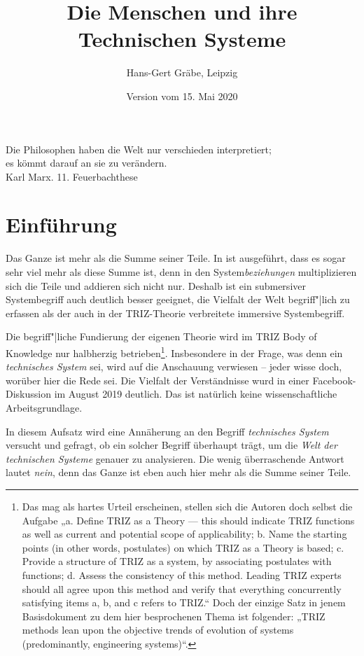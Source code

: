 \documentclass[11pt,a4paper]{article}
\title{Die Menschen und ihre Technischen Systeme}
\author{Hans-Gert Gräbe, Leipzig}
\date{Version vom 15. Mai 2020}
\begin{document}
\maketitle\vfill
\tableofcontents
\pagebreak
\begin{flushright}
  Die Philosophen haben die Welt nur verschieden interpretiert;\\ es kömmt
  darauf an sie zu verändern.\\ Karl Marx. 11. Feuerbachthese
\end{flushright}

\section{Einführung}

Das Ganze ist mehr als die Summe seiner Teile. In \cite{Graebe2020} ist
ausgeführt, dass es sogar sehr viel mehr als diese Summe ist, denn in den
System\emph{beziehungen} multiplizieren sich die Teile und addieren sich nicht
nur.  Deshalb ist ein submersiver Systembegriff auch deutlich besser geeignet,
die Vielfalt der Welt begriff"|lich zu erfassen als der auch in der
TRIZ-Theorie verbreitete immersive Systembegriff.

Die begriff"|liche Fundierung der eigenen Theorie wird im TRIZ Body of
Knowledge \cite{TBK-2007} nur halbherzig betrieben\footnote{Das mag als hartes
  Urteil erscheinen, stellen sich die Autoren doch selbst die Aufgabe „a.
  Define TRIZ as a Theory — this should indicate TRIZ functions as well as
  current and potential scope of applicability; b.  Name the starting points
  (in other words, postulates) on which TRIZ as a Theory is based; c.  Provide
  a structure of TRIZ as a system, by associating postulates with functions;
  d.  Assess the consistency of this method. Leading TRIZ experts should all
  agree upon this method and verify that everything concurrently satisfying
  items a, b, and c refers to TRIZ.“ Doch der einzige Satz in jenem
  Basisdokument zu dem hier besprochenen Thema ist folgender: „TRIZ methods
  lean upon the objective trends of evolution of systems (predominantly,
  engineering systems)“.}. Insbesondere in der Frage, was denn ein
\emph{technisches System} sei, wird auf die Anschauung verwiesen -- jeder
wisse doch, worüber hier die Rede sei. Die Vielfalt der Verständnisse wurd in
einer Facebook-Diskussion \cite{Graebe2019b} im August 2019 deutlich.  Das ist
natürlich keine wissenschaftliche Arbeitsgrundlage.

In diesem Aufsatz wird eine Annäherung an den Begriff \emph{technisches
  System} versucht und gefragt, ob ein solcher Begriff überhaupt trägt, um die
\emph{Welt der technischen Systeme} genauer zu analysieren.  Die wenig
überraschende Antwort lautet \emph{nein}, denn das Ganze ist eben auch hier
mehr als die Summe seiner Teile.
\end{document}
